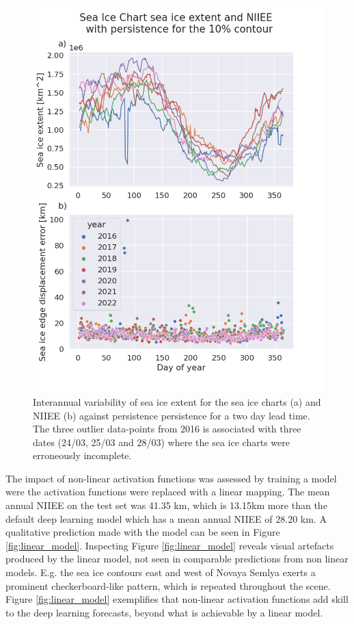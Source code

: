 \documentclass[../main/thesis]{subfiles}
\begin{document}
\begin{figure}
    \centering
    \includegraphics[width=.8\textwidth]{Persistence_NIIEE_SIE}
    \caption{\label{fig:NIIEE-and-SIE}Interannual variability of sea ice extent for the sea ice charts (a) and NIIEE (b) against persistence persistence for a two day lead time. The three outlier data-points from 2016 is associated with three dates (24/03, 25/03 and 28/03) where the sea ice charts were erroneously incomplete.}
\end{figure}

The impact of non-linear activation functions was assessed by training a model were the activation functions were replaced with a linear mapping. The mean annual NIIEE on the test set was 41.35 km, which is 13.15km more than the default deep learning model which has a mean annual NIIEE of 28.20 km. A qualitative prediction made with the model can be seen in Figure \ref{fig:linear_model}. Inspecting Figure \ref{fig:linear_model} reveals visual artefacts produced by the linear model, not seen in comparable predictions from non linear models. E.g. the sea ice contours east and west of Novaya Semlya exerts a prominent checkerboard-like pattern, which is repeated throughout the scene. Figure \ref{fig:linear_model} exemplifies that non-linear activation functions add skill to the deep learning forecasts, beyond what is achievable by a linear model.
\end{document}
